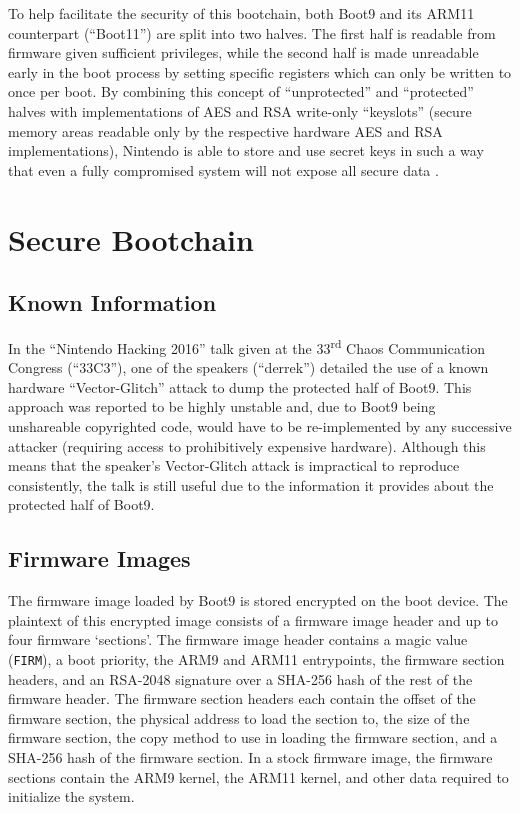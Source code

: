 \documentclass[journal]{IEEEtran}
\begin{document}
To help facilitate the security of this bootchain, both Boot9 and its ARM11
counterpart (``Boot11'') are split into two halves. The first half is readable
from firmware given sufficient privileges, while the second half is made
unreadable early in the boot process by setting specific registers which can
only be written to once per boot. By combining this concept of ``unprotected''
and ``protected'' halves with implementations of AES and RSA write-only
``keyslots'' (secure memory areas readable only by the respective hardware AES
and RSA implementations), Nintendo is able to store and use secret keys in such
a way that even a fully compromised system will not expose all secure data
\cite{AES_Registers}\cite{RSA_Registers}.

\section{Secure Bootchain}

\subsection{Known Information}

In the ``Nintendo Hacking 2016'' talk given at the 33\textsuperscript{rd} Chaos
Communication Congress (``33C3''), one of the speakers (``derrek'') detailed the
use of a known hardware ``Vector-Glitch'' attack to dump the protected half of
Boot9. This approach was reported to be highly unstable and, due to Boot9 being
unshareable copyrighted code, would have to be re-implemented by any successive
attacker (requiring access to prohibitively expensive hardware). Although this
means that the speaker's Vector-Glitch attack is impractical to reproduce
consistently, the talk is still useful due to the information it provides about
the protected half of Boot9\cite{33c3}.

\subsection{Firmware Images}

The firmware image loaded by Boot9 is stored encrypted on the boot device. The
plaintext of this encrypted image consists of a firmware image header and up to
four firmware `sections'. The firmware image header contains a magic value
(\texttt{FIRM}), a boot priority, the ARM9 and ARM11 entrypoints, the firmware
section headers, and an RSA-2048 signature over a SHA-256 hash of the rest of
the firmware header. The firmware section headers each contain the offset of the
firmware section, the physical address to load the section to, the size of the
firmware section, the copy method to use in loading the firmware section, and a
SHA-256 hash of the firmware section. In a stock firmware image, the firmware
sections contain the ARM9 kernel, the ARM11 kernel, and other data required to
initialize the system\cite{FIRM}.
\end{document}
